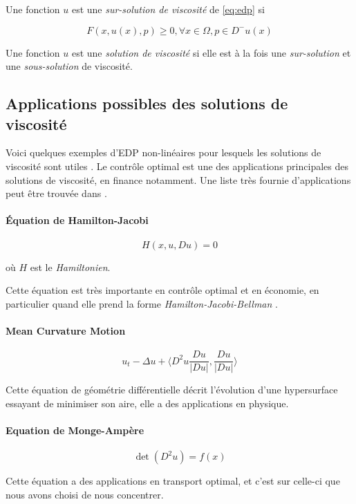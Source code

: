 \documentclass[12pt,a4paper,twoside]{article}
\begin{document}
Une fonction $u$ est une \emph{sur-solution de viscosité} de \ref{eq:edp} si 

$$F(x,u(x),p) \geq 0, \forall x \in \Omega, p \in D^{-}u(x) $$

Une fonction $u$ est une \emph{solution de viscosité} si elle est à la fois une \emph{sur-solution} et une 
\emph{sous-solution} de viscosité.


\subsection{Applications possibles des solutions de viscosité}

Voici quelques exemples d'EDP non-linéaires pour lesquels les solutions de viscosité sont utiles \cite{dragoniintroduction}. Le contrôle optimal est une des applications principales des solutions de viscosité, en finance notamment. Une liste très fournie d'applications peut être trouvée dans \cite{crandall1992user}.

\paragraph*{Équation de Hamilton-Jacobi}

$$ H(x,u,Du) = 0$$

où $H$ est le \emph{Hamiltonien}.

Cette équation est très importante en contrôle optimal et en économie, en particulier quand elle prend la forme 
\emph{Hamilton-Jacobi-Bellman} \cite{bardi2008optimal}.

\paragraph*{Mean Curvature Motion}

$$\displaystyle u_t - \Delta u + \langle D^2 u \frac{Du}{|Du|}, \frac{Du}{|Du|} \rangle  $$

Cette équation de géométrie différentielle décrit l'évolution d'une hypersurface essayant de minimiser son aire, elle
a des applications en physique.


\paragraph*{Equation de Monge-Ampère}

$$ \det(D^2 u) = f(x) $$

Cette équation a des applications en transport optimal, et c'est sur celle-ci que nous avons choisi de nous concentrer.
\end{document}
